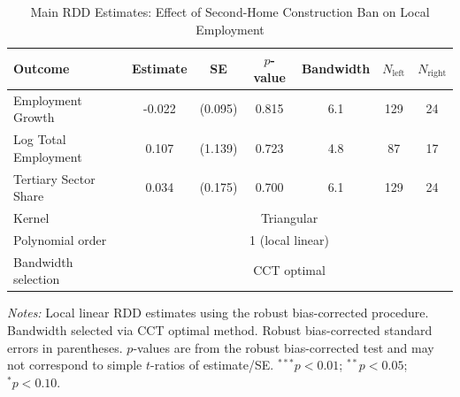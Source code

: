\begin{table}[htbp]
\centering
\caption{Main RDD Estimates: Effect of Second-Home Construction Ban on Local Employment}
\label{tab:main}
\begin{tabular}{lcccccc}
\toprule
Outcome & Estimate & SE & $p$-value & Bandwidth & $N_{\text{left}}$ & $N_{\text{right}}$ \\
\midrule
Employment Growth & -0.022 & (0.095) & 0.815 & 6.1 & 129 & 24 \\
Log Total Employment & 0.107 & (1.139) & 0.723 & 4.8 & 87 & 17 \\
Tertiary Sector Share & 0.034 & (0.175) & 0.700 & 6.1 & 129 & 24 \\
\midrule
Kernel & \multicolumn{6}{c}{Triangular} \\
Polynomial order & \multicolumn{6}{c}{1 (local linear)} \\
Bandwidth selection & \multicolumn{6}{c}{CCT optimal} \\
\bottomrule
\end{tabular}
\begin{minipage}{0.95\textwidth}
\vspace{0.3em}
\footnotesize \textit{Notes:} Local linear RDD estimates using the \citet{calonico2014} robust bias-corrected procedure.
Bandwidth selected via CCT optimal method. Robust bias-corrected standard errors in parentheses.
$p$-values are from the robust bias-corrected test and may not correspond to simple $t$-ratios of estimate/SE.
$^{***}p<0.01$; $^{**}p<0.05$; $^{*}p<0.10$.
\end{minipage}
\end{table}
